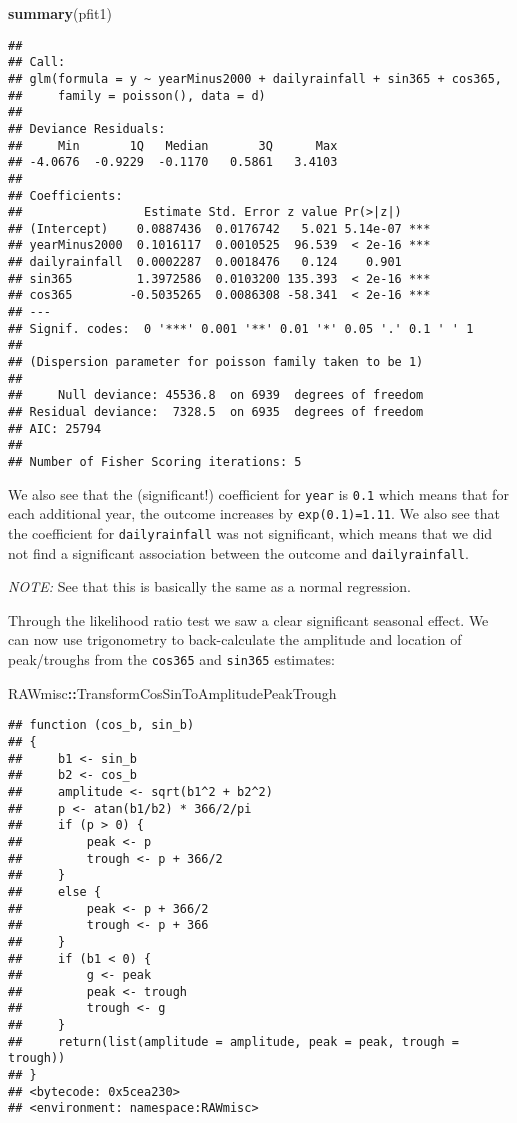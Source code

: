 \documentclass[]{book}
\newenvironment{Shaded}{\begin{snugshade}}{\end{snugshade}}
\newcommand{\KeywordTok}[1]{\textcolor[rgb]{0.13,0.29,0.53}{\textbf{#1}}}
\newcommand{\OperatorTok}[1]{\textcolor[rgb]{0.81,0.36,0.00}{\textbf{#1}}}
\newcommand{\NormalTok}[1]{#1}
\begin{document}
\begin{Shaded}
\begin{Highlighting}[]
\KeywordTok{summary}\NormalTok{(pfit1)}
\end{Highlighting}
\end{Shaded}

\begin{verbatim}
## 
## Call:
## glm(formula = y ~ yearMinus2000 + dailyrainfall + sin365 + cos365, 
##     family = poisson(), data = d)
## 
## Deviance Residuals: 
##     Min       1Q   Median       3Q      Max  
## -4.0676  -0.9229  -0.1170   0.5861   3.4103  
## 
## Coefficients:
##                 Estimate Std. Error z value Pr(>|z|)    
## (Intercept)    0.0887436  0.0176742   5.021 5.14e-07 ***
## yearMinus2000  0.1016117  0.0010525  96.539  < 2e-16 ***
## dailyrainfall  0.0002287  0.0018476   0.124    0.901    
## sin365         1.3972586  0.0103200 135.393  < 2e-16 ***
## cos365        -0.5035265  0.0086308 -58.341  < 2e-16 ***
## ---
## Signif. codes:  0 '***' 0.001 '**' 0.01 '*' 0.05 '.' 0.1 ' ' 1
## 
## (Dispersion parameter for poisson family taken to be 1)
## 
##     Null deviance: 45536.8  on 6939  degrees of freedom
## Residual deviance:  7328.5  on 6935  degrees of freedom
## AIC: 25794
## 
## Number of Fisher Scoring iterations: 5
\end{verbatim}

We also see that the (significant!) coefficient for \texttt{year} is
\texttt{0.1} which means that for each additional year, the outcome
increases by \texttt{exp(0.1)=1.11}. We also see that the coefficient
for \texttt{dailyrainfall} was not significant, which means that we did
not find a significant association between the outcome and
\texttt{dailyrainfall}.

\emph{NOTE:} See that this is basically the same as a normal regression.

Through the likelihood ratio test we saw a clear significant seasonal
effect. We can now use trigonometry to back-calculate the amplitude and
location of peak/troughs from the \texttt{cos365} and \texttt{sin365}
estimates:

\begin{Shaded}
\begin{Highlighting}[]
\NormalTok{RAWmisc}\OperatorTok{::}\NormalTok{TransformCosSinToAmplitudePeakTrough}
\end{Highlighting}
\end{Shaded}

\begin{verbatim}
## function (cos_b, sin_b) 
## {
##     b1 <- sin_b
##     b2 <- cos_b
##     amplitude <- sqrt(b1^2 + b2^2)
##     p <- atan(b1/b2) * 366/2/pi
##     if (p > 0) {
##         peak <- p
##         trough <- p + 366/2
##     }
##     else {
##         peak <- p + 366/2
##         trough <- p + 366
##     }
##     if (b1 < 0) {
##         g <- peak
##         peak <- trough
##         trough <- g
##     }
##     return(list(amplitude = amplitude, peak = peak, trough = trough))
## }
## <bytecode: 0x5cea230>
## <environment: namespace:RAWmisc>
\end{verbatim}
\end{document}

